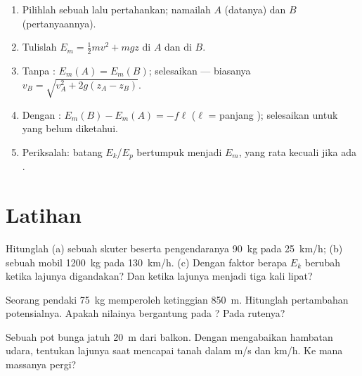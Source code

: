 \begin{method}\label{met:g11:mechanical-energy:bookkeeping}
\begin{enumerate}
  \item Pilihlah sebuah  lalu pertahankan; namailah $A$
        (datanya) dan $B$ (pertanyaannya).
  \item Tulislah $E_m = \tfrac12 mv^2 + mgz$ di $A$ dan di $B$.
  \item Tanpa : $E_m(A) = E_m(B)$; selesaikan --- biasanya
        $v_B = \sqrt{v_A^2 + 2g(z_A - z_B)}$.
  \item Dengan : $E_m(B) - E_m(A) = -f\ell$ ($\ell$ = panjang
        ); selesaikan untuk yang belum diketahui.
  \item Periksalah: batang $E_k$/$E_p$ bertumpuk menjadi $E_m$, yang
        rata kecuali jika ada .
\end{enumerate}
\end{method}

\section{Latihan}

\begin{exercise}[$\star$]\label{exo:g11:mechanical-energy:1}
Hitunglah  (a) sebuah skuter beserta pengendaranya
\qty{90}{kg} pada \qty{25}{km/h}; (b) sebuah mobil \qty{1200}{kg} pada
\qty{130}{km/h}. (c) Dengan faktor berapa $E_k$ berubah ketika lajunya
digandakan? Dan ketika lajunya menjadi tiga kali lipat?
\end{exercise}

\begin{exercise}[$\star$]\label{exo:g11:mechanical-energy:2}
Seorang pendaki \qty{75}{kg} memperoleh ketinggian \qty{850}{m}.
Hitunglah pertambahan  potensialnya. Apakah nilainya bergantung
pada ? Pada rutenya?
\end{exercise}

\begin{exercise}[$\star$]\label{exo:g11:mechanical-energy:3}
Sebuah pot bunga jatuh \qty{20}{m} dari balkon. Dengan mengabaikan
hambatan udara, tentukan lajunya saat mencapai tanah dalam \unit{m/s}
dan \unit{km/h}. Ke mana massanya pergi?
\end{exercise}

